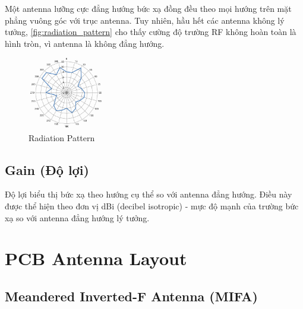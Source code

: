             Một antenna lưỡng cực đẳng hướng bức xạ đồng đều theo mọi hướng
            trên mặt phẳng vuông góc với trục antenna. Tuy nhiên, hầu hết các antenna
            không lý tưởng, \autoref{fig:radiation_pattern} cho thấy cường độ trường RF
            không hoàn toàn là hình tròn, vì antenna là không đẳng hướng.\par
            \begin{figure}[h]
                \centering
                \includegraphics[width=0.3\textwidth]{figures/radiation_pattern.png}
                \caption{Radiation Pattern}
                \label{fig:radiation_pattern}
            \end{figure}

        \subsection{Gain (Độ lợi)}
            Độ lợi biểu thị bức xạ theo hướng cụ thể so với antenna đẳng hướng.
            Điều này được thể hiện theo đơn vị dBi (decibel isotropic) - mực độ mạnh
            của trường bức xạ so với antenna đẳng hướng lý tưởng.\par

    \section{PCB Antenna Layout}
        \subsection{Meandered Inverted-F Antenna (MIFA)}
        
    